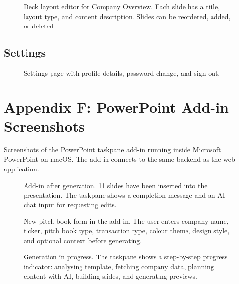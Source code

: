 \begin{figure}[H]
\centering
{}
\caption{Deck layout editor for Company Overview. Each slide has a title, layout type, and content description. Slides can be reordered, added, or deleted.}
\label{fig:app-layout-edit}
\end{figure}

\newpage

\subsection*{Settings}

\begin{figure}[H]
\centering
{}
\caption{Settings page with profile details, password change, and sign-out.}
\label{fig:app-settings}
\end{figure}

\newpage

\section*{Appendix F: PowerPoint Add-in Screenshots}

Screenshots of the PowerPoint taskpane add-in running inside Microsoft PowerPoint on macOS. The add-in connects to the same backend as the web application.

\begin{figure}[H]
\centering
{}
\caption{Add-in after generation. 11 slides have been inserted into the presentation. The taskpane shows a completion message and an AI chat input for requesting edits.}
\label{fig:addin-full}
\end{figure}

\begin{figure}[H]
\centering
{}
\caption{New pitch book form in the add-in. The user enters company name, ticker, pitch book type, transaction type, colour theme, design style, and optional context before generating.}
\label{fig:addin-new}
\end{figure}

\newpage

\begin{figure}[H]
\centering
{}
\caption{Generation in progress. The taskpane shows a step-by-step progress indicator: analysing template, fetching company data, planning content with AI, building slides, and generating previews.}
\label{fig:addin-loading}
\end{figure}

